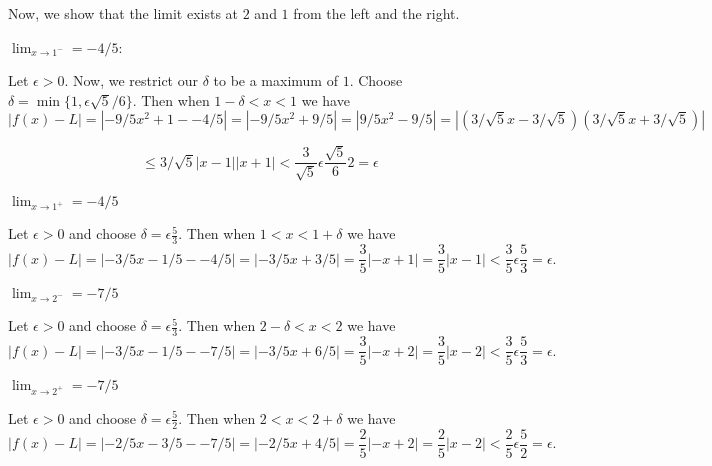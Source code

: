 \documentclass{report}
\begin{document}
Now, we show that the limit exists at $2$ and $1$ from the left and the right.

\bigskip
\begin{myproof}
   $\lim_{x \rightarrow 1^-} = -4/5 $:\par 
   Let $\epsilon > 0$. Now, we restrict our $\delta$ to be a maximum of $1.$ Choose $\delta = \min\{1, \epsilon\sqrt{5}/6\} $. Then when  $1 - \delta < x < 1$ we have $$|f(x) - L| =|-9/5 x^2+1 - -4/5| = |-9/5 x^2 + 9/5 | = |9/5 x^2 - 9/5 | = |(3/\sqrt{5} x - 3/\sqrt{5})(3/\sqrt{5} x + 3/\sqrt{5})|$$

   $$ \leq 3/\sqrt{5}|x -1||x+1| < \frac{3}{\sqrt{5}} \epsilon \frac{\sqrt{5}}{6}2 = \epsilon $$
\end{myproof}

\begin{myproof}
   $\lim_{x \rightarrow 1^+} = -4/5$\par

 Let $\epsilon > 0$ and choose $\delta = \epsilon \frac{5}{3}  $. Then when  $1  < x < 1 + \delta$ we have $$|f(x) - L| = |-3/5 x - 1/5 - -4/5| = |-3/5x + 3/5| = \frac{3}{5}|-x+1|= \frac{3}{5}|x-1| < \frac{3}{5} \epsilon \frac{5}{3}   = \epsilon.$$
\end{myproof}

\begin{myproof}
    
   $\lim_{x \rightarrow 2^-} = -7/5$\par

 Let $\epsilon > 0$ and choose $\delta = \epsilon \frac{5}{3}  $. Then when  $2 - \delta  < x < 2$ we have $$|f(x) - L| = |-3/5 x - 1/5 - -7/5| = |-3/5x + 6/5| = \frac{3}{5}|-x+2|= \frac{3}{5}|x-2| < \frac{3}{5} \epsilon \frac{5}{3}   = \epsilon.$$
\end{myproof}


\begin{myproof}
    
   $\lim_{x \rightarrow 2^+} = -7/5$\par

 Let $\epsilon > 0$ and choose $\delta = \epsilon \frac{5}{2}  $. Then when  $2  < x < 2 + \delta$ we have $$|f(x) - L| = |-2/5 x - 3/5 - -7/5| = |-2/5x + 4/5| = \frac{2}{5}|-x+2|= \frac{2}{5}|x-2| < \frac{2}{5} \epsilon \frac{5}{2}   = \epsilon.$$
\end{myproof}
\end{document}
